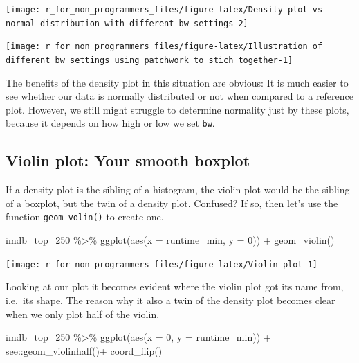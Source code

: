 \documentclass[
]{book}
\newenvironment{Shaded}{\begin{snugshade}}{\end{snugshade}}
\newcommand{\AttributeTok}[1]{\textcolor[rgb]{0.77,0.63,0.00}{#1}}
\newcommand{\DecValTok}[1]{\textcolor[rgb]{0.00,0.00,0.81}{#1}}
\newcommand{\FunctionTok}[1]{\textcolor[rgb]{0.00,0.00,0.00}{#1}}
\newcommand{\NormalTok}[1]{#1}
\newcommand{\SpecialCharTok}[1]{\textcolor[rgb]{0.00,0.00,0.00}{#1}}
\begin{document}
\begin{center}\texttt{[image: r\_for\_non\_programmers\_files/figure-latex/Density plot vs normal distribution with different bw settings-2]} \end{center}

\begin{center}\texttt{[image: r\_for\_non\_programmers\_files/figure-latex/Illustration of different bw settings using patchwork to stich together-1]} \end{center}

The benefits of the density plot in this situation are obvious: It is much easier to see whether our data is normally distributed or not when compared to a reference plot. However, we still might struggle to determine normality just by these plots, because it depends on how high or low we set \texttt{bw}.

\hypertarget{violin-plot-your-smooth-boxplot}{%
\subsection{Violin plot: Your smooth boxplot}\label{violin-plot-your-smooth-boxplot}}

If a density plot is the sibling of a histogram, the violin plot would be the sibling of a boxplot, but the twin of a density plot. Confused? If so, then let's use the function \texttt{geom\_volin()} to create one.

\begin{Shaded}
\begin{Highlighting}[]
\NormalTok{imdb\_top\_250 }\SpecialCharTok{\%\textgreater{}\%}
  \FunctionTok{ggplot}\NormalTok{(}\FunctionTok{aes}\NormalTok{(}\AttributeTok{x =}\NormalTok{ runtime\_min, }\AttributeTok{y =} \DecValTok{0}\NormalTok{)) }\SpecialCharTok{+}
  \FunctionTok{geom\_violin}\NormalTok{()}
\end{Highlighting}
\end{Shaded}

\begin{center}\texttt{[image: r\_for\_non\_programmers\_files/figure-latex/Violin plot-1]} \end{center}

Looking at our plot it becomes evident where the violin plot got its name from, i.e.~its shape. The reason why it also a twin of the density plot becomes clear when we only plot half of the violin.

\begin{Shaded}
\begin{Highlighting}[]
\NormalTok{imdb\_top\_250 }\SpecialCharTok{\%\textgreater{}\%}
  \FunctionTok{ggplot}\NormalTok{(}\FunctionTok{aes}\NormalTok{(}\AttributeTok{x =} \DecValTok{0}\NormalTok{, }\AttributeTok{y =}\NormalTok{ runtime\_min)) }\SpecialCharTok{+}
\NormalTok{  see}\SpecialCharTok{::}\FunctionTok{geom\_violinhalf}\NormalTok{()}\SpecialCharTok{+}
  \FunctionTok{coord\_flip}\NormalTok{()}
\end{Highlighting}
\end{Shaded}
\end{document}
